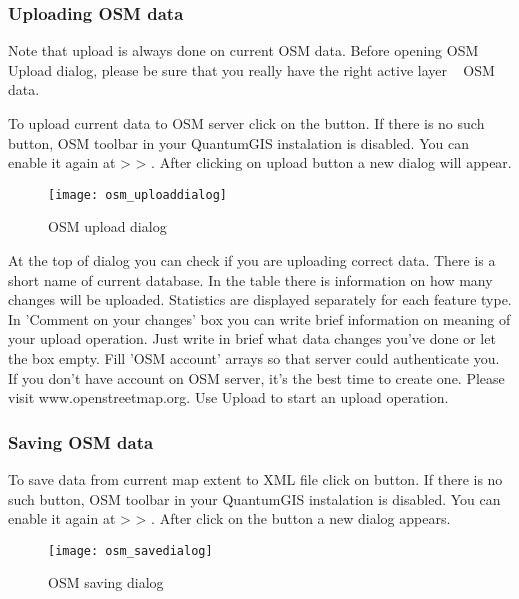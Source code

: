 \subsubsection{Uploading OSM data}  

Note that upload is always done on current OSM data. Before opening OSM
Upload dialog, please be sure that you really have the right active layer ~
OSM data.

To upload current data to OSM server click on the 
 button. If there is no such button, 
OSM toolbar in your QuantumGIS instalation is disabled. You can enable it 
again at  >  > 
. After clicking on upload button a new dialog 
will appear.

\begin{figure}[ht]
   \begin{center}
   \caption{OSM upload dialog \nixcaption}\label{fig:osmupload}\smallskip
   \texttt{[image: osm\_uploaddialog]}
\end{center}
\end{figure}

At the top of dialog you can check if you are uploading correct data. There
is a short name of current database. In the table there is information on how
many changes will be uploaded. Statistics are displayed separately for each
feature type.
In 'Comment on your changes' box you can write brief information on meaning
of your upload operation. Just write in brief what data changes you've done
or let the box empty.
Fill 'OSM account' arrays so that server could authenticate you. If you don't
have account on OSM server, it's the best time to create one. Please visit
www.openstreetmap.org.
Use Upload to start an upload operation.

\subsubsection{Saving OSM data}  

To save data from current map extent to XML file click on 
 button. If there is no such button, 
OSM toolbar in your QuantumGIS instalation is disabled. You can enable it 
again at  >  >
. After click on the button a new dialog appears.

\begin{figure}[ht]
   \begin{center}
   \caption{OSM saving dialog \nixcaption}\label{fig:osmsave}\smallskip
   \texttt{[image: osm\_savedialog]}
\end{center}
\end{figure}

